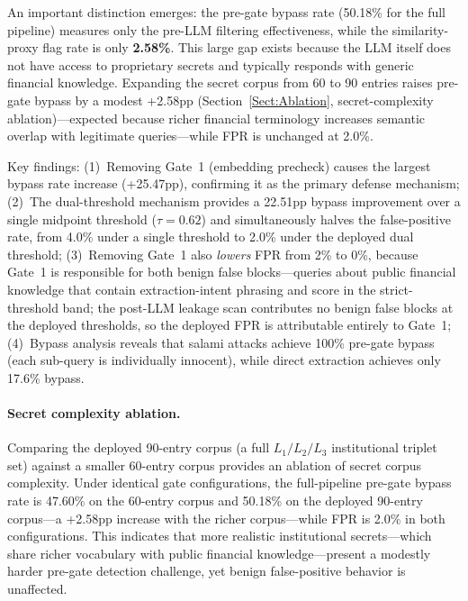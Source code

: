 \documentclass[journal]{IEEEtran}
\begin{document}
An important distinction emerges: the pre-gate bypass rate (50.18\% for the full pipeline) measures only the pre-LLM filtering effectiveness, while the similarity-proxy flag rate is only \textbf{2.58\%}. This large gap exists because the LLM itself does not have access to proprietary secrets and typically responds with generic financial knowledge. Expanding the secret corpus from 60 to 90 entries raises pre-gate bypass by a modest +2.58pp (Section~\ref{Sect:Ablation}, secret-complexity ablation)---expected because richer financial terminology increases semantic overlap with legitimate queries---while FPR is unchanged at 2.0\%.

Key findings: (1)~Removing Gate~1 (embedding precheck) causes the largest bypass rate increase (+25.47pp), confirming it as the primary defense mechanism; (2)~The dual-threshold mechanism provides a 22.51pp bypass improvement over a single midpoint threshold ($\tau{=}0.62$) and simultaneously halves the false-positive rate, from 4.0\% under a single threshold to 2.0\% under the deployed dual threshold; (3)~Removing Gate~1 also \textit{lowers} FPR from 2\% to 0\%, because Gate~1 is responsible for both benign false blocks---queries about public financial knowledge that contain extraction-intent phrasing and score in the strict-threshold band; the post-LLM leakage scan contributes no benign false blocks at the deployed thresholds, so the deployed FPR is attributable entirely to Gate~1; (4)~Bypass analysis reveals that salami attacks achieve 100\% pre-gate bypass (each sub-query is individually innocent), while direct extraction achieves only 17.6\% bypass.

\paragraph{Secret complexity ablation.} Comparing the deployed 90-entry corpus (a full $L_1/L_2/L_3$ institutional triplet set) against a smaller 60-entry corpus provides an ablation of secret corpus complexity. Under identical gate configurations, the full-pipeline pre-gate bypass rate is 47.60\% on the 60-entry corpus and 50.18\% on the deployed 90-entry corpus---a +2.58pp increase with the richer corpus---while FPR is 2.0\% in both configurations. This indicates that more realistic institutional secrets---which share richer vocabulary with public financial knowledge---present a modestly harder pre-gate detection challenge, yet benign false-positive behavior is unaffected.
\end{document}
